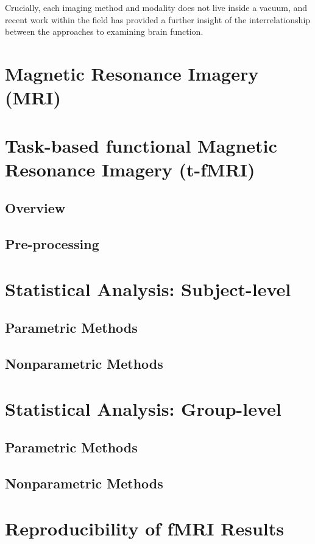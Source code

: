 Crucially, each imaging method and modality does not live inside a vacuum, and recent work within the field has provided a further insight of the interrelationship between the approaches to examining brain function. 


\section{Magnetic Resonance Imagery (MRI)}

\section{Task-based functional Magnetic Resonance Imagery (t-fMRI)}

\subsection{Overview}

\subsection{Pre-processing}

\section{Statistical Analysis: Subject-level}

\subsection{Parametric Methods}

\subsection{Nonparametric Methods}

\section{Statistical Analysis: Group-level}

\subsection{Parametric Methods}

\subsection{Nonparametric Methods}

\section{Reproducibility of fMRI Results}

